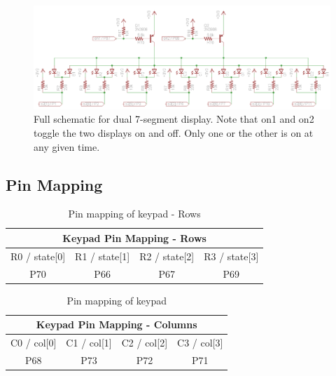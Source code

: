 \documentclass[11pt]{article}
\begin{document}
\begin{figure}[h!]
\centering
\includegraphics[scale=0.7, angle=90]{seven_segment_all.png}
\caption{Full schematic for dual 7-segment display. Note that on1 and on2 toggle the two displays on and off. Only one or the other is on at any given time.}
\label{fig:seven_seg_sch}
\end{figure} 


\clearpage

\subsection{Pin Mapping}

\begin{table}[h!]
\centering
\begin{tabular}{|c|c|c|c|}
\hline
\multicolumn{4}{|c|}{\textbf{Keypad Pin Mapping - Rows}}                                                                                                     \\ \hline
R0 / state{[}0{]} & R1 / state{[}1{]} & R2 / state{[}2{]} & R3 / state{[}3{]} \\ \hline
P70               & P66               & P67               & P69               \\ \hline
\end{tabular}
\caption{Pin mapping of keypad - Rows}
\label{table:pinmap_keypad_row}
\end{table}


\begin{table}[h!]
\centering
\begin{tabular}{|c|c|c|c|}
\hline
\multicolumn{4}{|c|}{\textbf{Keypad Pin Mapping - Columns}}                                                                                                     \\ \hline
C0 / col{[}0{]} & C1 / col{[}1{]} & C2 / col{[}2{]} & C3 / col{[}3{]} \\ \hline
P68             & P73             & P72             & P71             \\ \hline
\end{tabular}
\caption{Pin mapping of keypad}
\label{table:pinmap_keypad_col}
\end{table}
\end{document}
